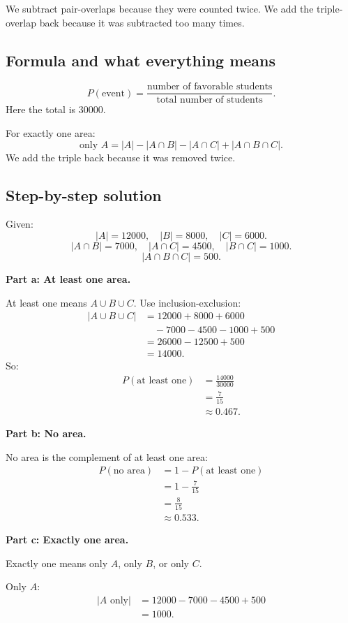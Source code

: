 \documentclass[11pt,a4paper]{article}
\begin{document}
We subtract pair-overlaps because they were counted twice. We add the triple-overlap back because it was subtracted too many times.

\subsection*{Formula and what everything means}
\[
P(\text{event})=\frac{\text{number of favorable students}}{\text{total number of students}}.
\]
Here the total is \(30000\).

For exactly one area:
\[
\text{only }A=|A|-|A\cap B|-|A\cap C|+|A\cap B\cap C|.
\]
We add the triple back because it was removed twice.

\subsection*{Step-by-step solution}
Given:
\[
|A|=12000,\quad |B|=8000,\quad |C|=6000.
\]
\[
|A\cap B|=7000,\quad |A\cap C|=4500,\quad |B\cap C|=1000.
\]
\[
|A\cap B\cap C|=500.
\]

\textbf{Part a: At least one area.}

At least one means \(A\cup B\cup C\). Use inclusion-exclusion:
\begin{align*}
|A\cup B\cup C|
&=12000+8000+6000\\
&\quad -7000-4500-1000+500\\
&=26000-12500+500\\
&=14000.
\end{align*}
So:
\begin{align*}
P(\text{at least one})
&=\frac{14000}{30000}\\
&=\frac{7}{15}\\
&\approx 0.467.
\end{align*}

\textbf{Part b: No area.}

No area is the complement of at least one area:
\begin{align*}
P(\text{no area})
&=1-P(\text{at least one})\\
&=1-\frac{7}{15}\\
&=\frac{8}{15}\\
&\approx 0.533.
\end{align*}

\textbf{Part c: Exactly one area.}

Exactly one means only \(A\), only \(B\), or only \(C\).

Only \(A\):
\begin{align*}
|A\text{ only}|
&=12000-7000-4500+500\\
&=1000.
\end{align*}
\end{document}
